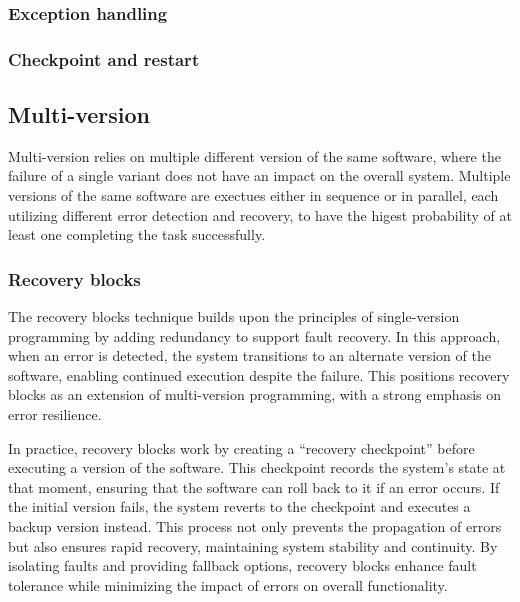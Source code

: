 \documentclass[12pt, letterpaper]{article}
\begin{document}
\subsubsection{Exception handling}

\subsubsection{Checkpoint and restart}

\subsection{Multi-version}

Multi-version relies on multiple different version of the same software, where the failure of a single variant does not have an impact on the overall system.
Multiple versions of the same software are exectues either in sequence or in parallel, each utilizing different error detection and recovery, to have the higest probability of at least one completing the task successfully.

\subsubsection{Recovery blocks}

The recovery blocks technique builds upon the principles of single-version programming by adding redundancy to support fault recovery. In this approach, when an error is detected, the system transitions to an alternate version of the software, enabling continued execution despite the failure. This positions recovery blocks as an extension of multi-version programming, with a strong emphasis on error resilience.

In practice, recovery blocks work by creating a “recovery checkpoint” before executing a version of the software. This checkpoint records the system’s state at that moment, ensuring that the software can roll back to it if an error occurs. If the initial version fails, the system reverts to the checkpoint and executes a backup version instead. This process not only prevents the propagation of errors but also ensures rapid recovery, maintaining system stability and continuity. By isolating faults and providing fallback options, recovery blocks enhance fault tolerance while minimizing the impact of errors on overall functionality.
\end{document}
